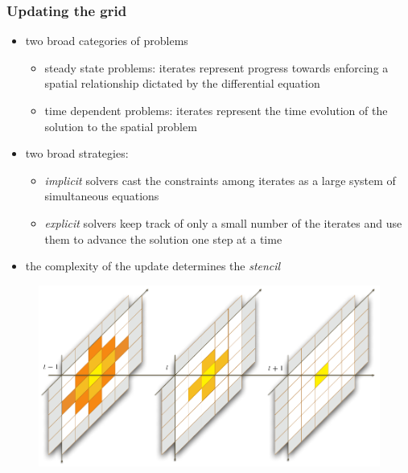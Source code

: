 \begin{frame}[fragile]
%
  \frametitle{Updating the grid}
%
  \begin{itemize}
%
  \item two broad categories of problems
    \begin{itemize}
      \item steady state problems: iterates represent progress towards enforcing a spatial
        relationship dictated by the differential equation
      \item time dependent problems: iterates represent the time evolution of the solution to
        the spatial problem
    \end{itemize}
%
  \item two broad strategies:
    \begin{itemize}
      \item {\em implicit} solvers cast the constraints among iterates as a large system of
        simultaneous equations
      \item {\em explicit} solvers keep track of only a small number of the iterates
        and use them to advance the solution one step at a time
    \end{itemize}
%
  \item the complexity of the update determines the {\em stencil}
% 
  \end{itemize}
%
  \begin{figure}
    \includegraphics[scale=0.4]{figures/structured-updates.pdf}
  \end{figure} 
%
\end{frame}

